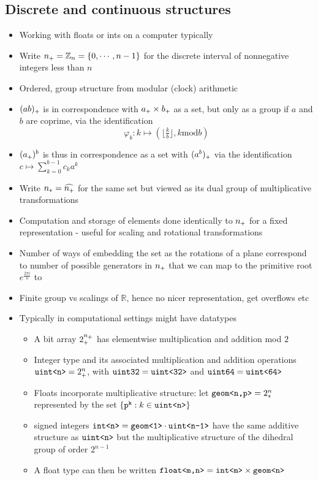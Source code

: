 \documentclass{article}
\begin{document}
\subsection{Discrete and continuous structures}
      \begin{itemize}
        \item
          Working with floats or ints on a computer typically
        \item
          Write $\NA n={\X Z}_n=\{0,\cdots,n-1\}$ for the discrete interval of nonnegative integers less than $n$
        \item
          Ordered, group structure from modular (clock) arithmetic
        \item
          $\NA{(ab)}$ is in correspondence with $\NA{a}\times\NA{b}$ as a set, but only as a group if $a$ and $b$ are coprime, via the identification
          $$
          \varphi_b:k\mapsto(\lfloor\tfrac kb\rfloor,k\textrm{mod}b)
          $$
        \item
          $(\NA a)^b$ is thus in correspondence as a set with $\NA{(a^b)}$ via the identification $c\mapsto\sum_{k=0}^{b-1}c_ka^k$
        \item
          Write $\NM n=\DG{\NA n}$ for the same set but viewed as its dual group of multiplicative transformations
        \item
          Computation and storage of elements done identically to $\NA n$ for a fixed representation - useful for scaling and rotational transformations
        \item
          Number of ways of embedding the set as the rotations of a plane correspond to number of possible generators in $\NA n$ that we can map to the primitive root $e^{\tfrac{2\pi i}{n}}$ to
        \item
          Finite group vs scalings of $\mathbb R$, hence no nicer representation, get overflows etc
        \item
          Typically in computational settings might have datatypes
          \begin{itemize}
            \item
              A bit array $\NA{2^\NA n}$ has elementwise multiplication and addition mod $2$
            \item
              Integer type and its associated multiplication and addition operations $\UINT n=\NA{2^n}$, with ${\texttt{uint32}}={\texttt{uint<{32}>}}$ and ${\texttt{uint64}}={\texttt{uint<{64}>}}$
            \item
              Floats incorporate multiplicative structure: let ${\texttt{geom<{n,p}>}}={2^n_*}$ represented by the set $\{\texttt{p}^{\texttt{k}}:k\in{\texttt{uint<{n}>}}\}$
            \item
              signed integers ${\texttt{int<{n}>}}={\texttt{geom<{1}>}}\cdot{\texttt{uint<{n-1}>}}$ have the same additive structure as ${\texttt{uint<{n}>}}$ but the multiplicative structure of the dihedral group of order $2^{n-1}$
            \item
              A float type can then be written ${\texttt{float<{m},{n}>}}={\texttt{int<{m}>}}\times{\texttt{geom<{n}>}}$
          \end{itemize}
      \end{itemize}
    
\end{document}
